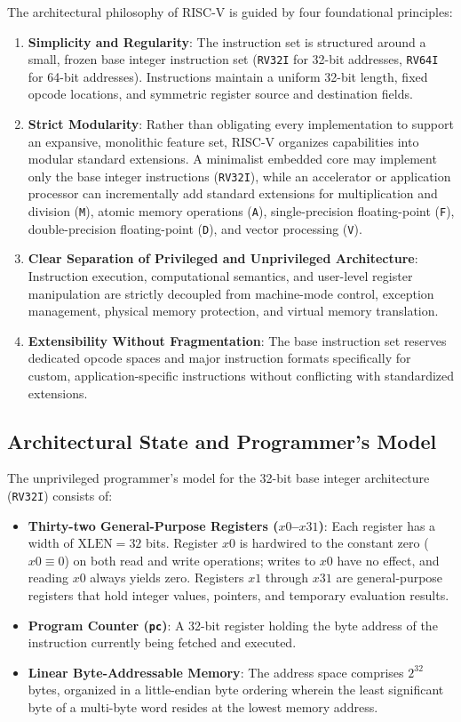 The architectural philosophy of RISC-V is guided by four foundational principles:
\begin{enumerate}
    \item \textbf{Simplicity and Regularity}: The instruction set is structured around a small, frozen base integer instruction set (\texttt{RV32I} for 32-bit addresses, \texttt{RV64I} for 64-bit addresses). Instructions maintain a uniform 32-bit length, fixed opcode locations, and symmetric register source and destination fields.
    \item \textbf{Strict Modularity}: Rather than obligating every implementation to support an expansive, monolithic feature set, RISC-V organizes capabilities into modular standard extensions. A minimalist embedded core may implement only the base integer instructions (\texttt{RV32I}), while an accelerator or application processor can incrementally add standard extensions for multiplication and division (\texttt{M}), atomic memory operations (\texttt{A}), single-precision floating-point (\texttt{F}), double-precision floating-point (\texttt{D}), and vector processing (\texttt{V}).
    \item \textbf{Clear Separation of Privileged and Unprivileged Architecture}: Instruction execution, computational semantics, and user-level register manipulation are strictly decoupled from machine-mode control, exception management, physical memory protection, and virtual memory translation.
    \item \textbf{Extensibility Without Fragmentation}: The base instruction set reserves dedicated opcode spaces and major instruction formats specifically for custom, application-specific instructions without conflicting with standardized extensions.
\end{enumerate}

\subsection{Architectural State and Programmer's Model}

The unprivileged programmer's model for the 32-bit base integer architecture (\texttt{RV32I}) consists of:
\begin{itemize}
    \item \textbf{Thirty-two General-Purpose Registers ($x0$--$x31$)}: Each register has a width of $\text{XLEN} = 32$ bits. Register $x0$ is hardwired to the constant zero ($x0 \equiv 0$) on both read and write operations; writes to $x0$ have no effect, and reading $x0$ always yields zero. Registers $x1$ through $x31$ are general-purpose registers that hold integer values, pointers, and temporary evaluation results.
    \item \textbf{Program Counter (\texttt{pc})}: A 32-bit register holding the byte address of the instruction currently being fetched and executed.
    \item \textbf{Linear Byte-Addressable Memory}: The address space comprises $2^{32}$ bytes, organized in a little-endian byte ordering wherein the least significant byte of a multi-byte word resides at the lowest memory address.
\end{itemize}

